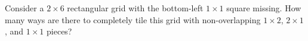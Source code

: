 Consider a $2 \times 6$ rectangular grid with the bottom-left $1 \times 1$ square missing. How many ways are there to completely tile this grid with non-overlapping $1\times 2$, $2 \times 1$, and $1 \times 1$ pieces?
